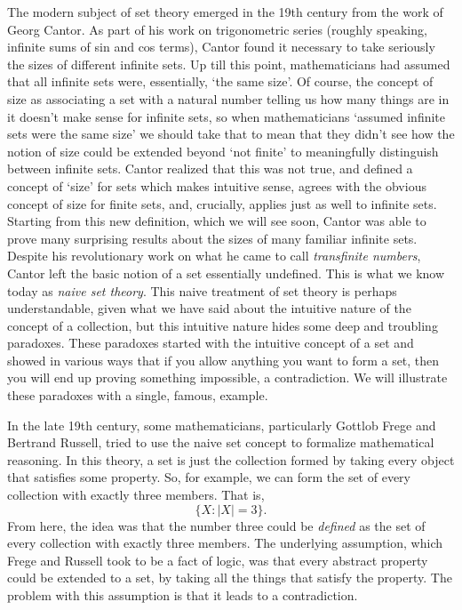 \documentclass{article}
\theoremstyle{plain}
\begin{document}
The modern subject of set theory emerged in the 19th century from the work of Georg Cantor. As part of his work on trigonometric series (roughly speaking, infinite sums of sin and cos terms), Cantor found it necessary to take seriously the sizes of different infinite sets. Up till this point, mathematicians had assumed that all infinite sets were, essentially, `the same size'. Of course, the concept of size as associating a set with a natural number telling us how many things are in it doesn't make sense for infinite sets, so when mathematicians `assumed infinite sets were the same size' we should take that to mean that they didn't see how the notion of size could be extended beyond `not finite' to meaningfully distinguish between infinite sets. Cantor realized that this was not true, and defined a concept of `size' for sets which makes intuitive sense, agrees with the obvious concept of size for finite sets, and, crucially, applies just as well to infinite sets. Starting from this new definition, which we will see soon, Cantor was able to prove many surprising results about the sizes of many familiar infinite sets. Despite his revolutionary work on what he came to call \emph{transfinite numbers}, Cantor left the basic notion of a set essentially undefined. This is what we know today as \emph{naive set theory}. This naive treatment of set theory is perhaps understandable, given what we have said about the intuitive nature of the concept of a collection, but this intuitive nature hides some deep and troubling paradoxes. These paradoxes started with the intuitive concept of a set and showed in various ways that if you allow anything you want to form a set, then you will end up proving something impossible, a contradiction. We will illustrate these paradoxes with a single, famous, example. 
 
In the late 19th century, some mathematicians, particularly Gottlob Frege and Bertrand Russell, tried to use the naive set concept to formalize mathematical reasoning. In this theory, a set is just the collection formed by taking every object that satisfies some property. So, for example, we can form the set of every collection with exactly three members. That is,
\[\{X : |X|= 3\}.\] From here, the idea was that the number three could be \emph{defined} as the set of every collection with exactly three members. The underlying assumption, which Frege and Russell took to be a fact of logic, was that every abstract property could be extended to a set, by taking all the things that satisfy the property. The problem with this assumption is that it leads to a contradiction.
\end{document}
